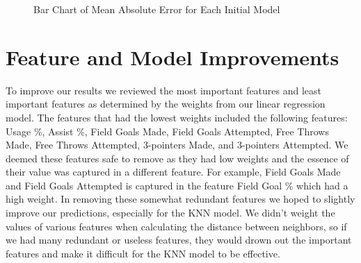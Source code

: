 \documentclass{article}
\begin{document}
\begin{figure}
	\begin{center}
    \caption{Bar Chart of Mean Absolute Error for Each Initial Model}
    \label{fig:initial_results}
	\end{center}
\end{figure}

\section{Feature and Model Improvements}

To improve our results we reviewed the most important features and least
important features as determined by the weights from our linear regression
model. The features that had the lowest weights included the following features:
Usage \%, Assist \%, Field Goals Made, Field Goals Attempted, Free Throws Made,
Free Throws Attempted, 3-pointers Made, and 3-pointers Attempted. We deemed
these features safe to remove as they had low weights and the essence of their
value was captured in a different feature. For example, Field Goals Made and
Field Goals Attempted is captured in the feature Field Goal \% which had a high
weight. In removing these somewhat redundant features we hoped to slightly
improve our predictions, especially for the KNN model. We didn't weight the
values of various features when calculating the distance between neighbors, so
if we had many redundant or useless features, they would drown out the important
features and make it difficult for the KNN model to be effective.
\end{document}
